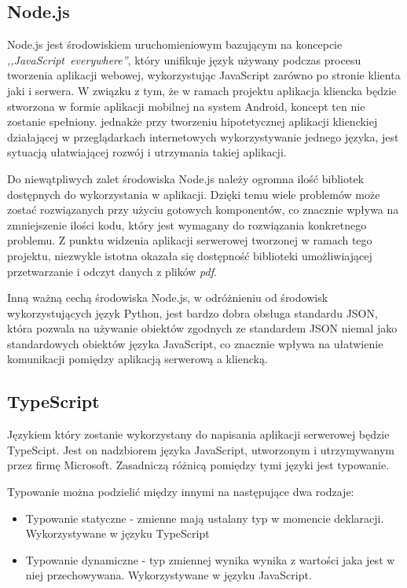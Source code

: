 \documentclass[a4paper,12pt,twoside,openany]{report}
\begin{document}
\subsection{Node.js}
Node.js jest środowiskiem uruchomieniowym bazującym na koncepcie \textit{,,JavaScript~everywhere''}, który unifikuje język używany podczas procesu tworzenia aplikacji webowej, wykorzystując JavaScript zarówno po stronie klienta jaki i serwera. W związku z tym, że w ramach projektu aplikacja kliencka będzie stworzona w formie aplikacji mobilnej na system Android, koncept ten nie zostanie spełniony. jednakże przy tworzeniu hipotetycznej aplikacji klienckiej działającej w przeglądarkach internetowych wykorzystywanie jednego języka, jest  sytuacją ułatwiającej rozwój i utrzymania takiej aplikacji.

Do niewątpliwych zalet środowiska Node.js należy ogromna ilość bibliotek dostępnych do wykorzystania w aplikacji. Dzięki temu wiele problemów może zostać rozwiązanych przy użyciu gotowych komponentów, co znacznie wpływa na zmniejszenie ilości kodu, który jest wymagany do rozwiązania konkretnego problemu. Z punktu widzenia aplikacji serwerowej tworzonej w ramach tego projektu, niezwykle istotna okazała się dostępność biblioteki umożliwiającej przetwarzanie i odczyt danych z plików \textit{pdf}. 

Inną ważną cechą środowiska Node.js, w odróżnieniu od środowisk wykorzystujących  język Python, jest bardzo dobra obsługa standardu JSON, która pozwala na używanie obiektów zgodnych ze standardem JSON niemal jako standardowych obiektów języka JavaScript, co znacznie wpływa na ułatwienie komunikacji pomiędzy aplikacją serwerową a kliencką. 

\subsection{TypeScript}
Językiem który zostanie wykorzystany do napisania aplikacji serwerowej będzie TypeScipt. Jest on nadzbiorem języka JavaScript, utworzonym i utrzymywanym przez firmę Microsoft. Zasadniczą różnicą pomiędzy tymi języki jest typowanie.

Typowanie można podzielić między innymi na następujące dwa rodzaje:
\begin{itemize}
	\item Typowanie statyczne - zmienne mają ustalany typ w momencie deklaracji. Wykorzystywane w języku TypeScript
	\item Typowanie dynamiczne -  typ zmiennej wynika wynika z wartości jaka jest w niej przechowywana. Wykorzystywane w języku JavaScript.
\end{itemize}
\end{document}
